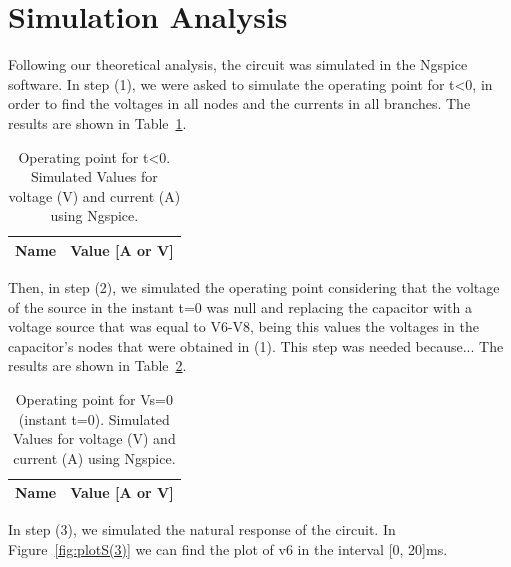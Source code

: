 \section{Simulation Analysis}
\label{sec:simulation}

Following our theoretical analysis, the circuit was simulated in the Ngspice software. 
In step (1), we were asked to simulate the operating point for t<0, in order to find the voltages in all nodes and the currents in all branches. The results are shown in Table~\ref{tab:alinea1}.

\begin{table}[h]
  \centering
  \begin{tabular}{|l|r|}
    \hline    
    {\bf Name} & {\bf Value [A or V]} \\ \hline
    
  \end{tabular}
  \caption{Operating point for t<0. Simulated Values for voltage (V) and current (A) using Ngspice.}
  \label{tab:alinea1}
\end{table}

Then, in step (2), we simulated the operating point considering that the voltage of the source in the instant t=0 was null and replacing the capacitor with a voltage source that was equal to V6-V8, being this values the voltages in the capacitor's nodes that were obtained in (1). This step was needed because... The results are shown in Table~\ref{tab:alinea2}.

\begin{table}[h]
  \centering
  \begin{tabular}{|l|r|}
    \hline    
    {\bf Name} & {\bf Value [A or V]} \\ \hline
    
  \end{tabular}
  \caption{Operating point for Vs=0 (instant t=0). Simulated Values for voltage (V) and current (A) using Ngspice.}
  \label{tab:alinea2}
\end{table}

In step (3), we simulated the natural response of the circuit. In Figure~\ref{fig:plotS(3)} we can find the plot of v6 in the interval [0, 20]ms.

